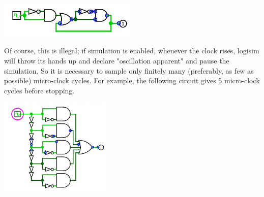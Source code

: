 \documentclass{article}
\begin{document}
	\begin{center}\includegraphics[width=0.5\textwidth]{images/micro_clock.png}\end{center}

Of course, this is illegal; if simulation is enabled, whenever the clock rises, logisim will throw its hands up and declare "oscillation apparent" and pause the simulation. So it is necessary to sample only finitely many (preferably, as few as possible) micro-clock cycles. For example, the following circuit gives 5 micro-clock cycles before stopping.

	\begin{center}\includegraphics[width=0.4\textwidth]{images/micro_clock_extraction.png}\end{center}
\end{document}
